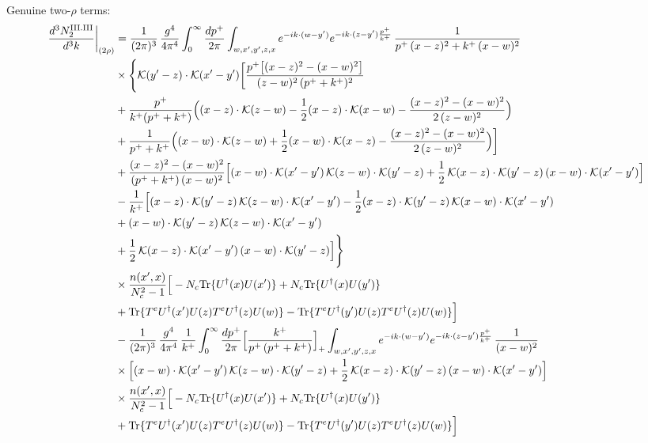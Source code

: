 \documentclass[9pt]{article}
\numberwithin{equation}{section}
\begin{document}
Genuine two-$\rho$ terms:
\begin{align}
\frac{d^{3}N^{\rm III.III}_{2}}{d^{3}k}\bigg|_{(2\rho)} & =\frac{1}{(2\pi)^{3}}\,\frac{g^{4}}{4\pi^{4}}\int_{0}^{\infty}\frac{dp^{+}}{2\pi}\int_{w,x',y',z,x}e^{-ik\cdot(w-y')}e^{-ik\cdot(z-y')\frac{p^{+}}{k^{+}}}\,\frac{1}{p^{+}\,(x-z)^{2}+k^{+}\,(x-w)^{2}}\notag\\
&\times\Bigg\{\mathcal{K}(y'-z)\cdot\mathcal{K}(x'-y')\bigg[\frac{p^{+}\big[(x-z)^{2}-(x-w)^{2}\big]}{(z-w)^{2}\,(p^{+}+k^{+})^{2}}\notag\\
&+\frac{p^{+}}{k^{+}(p^{+}+k^{+})}\Big((x-z)\cdot\mathcal{K}(z-w)-\frac{1}{2}(x-z)\cdot\mathcal{K}(x-w)-\frac{(x-z)^{2}-(x-w)^{2}}{2\,(z-w)^{2}}\Big)\notag\\
&+\frac{1}{p^{+}+k^{+}}\Big((x-w)\cdot\mathcal{K}(z-w)+\frac{1}{2}(x-w)\cdot\mathcal{K}(x-z)-\frac{(x-z)^{2}-(x-w)^{2}}{2\,(z-w)^{2}}\Big)\bigg]\notag\\
&+\frac{(x-z)^{2}-(x-w)^{2}}{(p^{+}+k^{+})\,(x-w)^{2}}\Big[(x-w)\cdot\mathcal{K}(x'-y')\,\mathcal{K}(z-w)\cdot\mathcal{K}(y'-z)+\frac{1}{2}\,\mathcal{K}(x-z)\cdot\mathcal{K}(y'-z)\,(x-w)\cdot\mathcal{K}(x'-y')\Big]\notag\\
&-\frac{1}{k^{+}}\Big[(x-z)\cdot\mathcal{K}(y'-z)\,\mathcal{K}(z-w)\cdot\mathcal{K}(x'-y')-\frac{1}{2}(x-z)\cdot\mathcal{K}(y'-z)\,\mathcal{K}(x-w)\cdot\mathcal{K}(x'-y')\notag\\
&+(x-w)\cdot\mathcal{K}(y'-z)\,\mathcal{K}(z-w)\cdot\mathcal{K}(x'-y')\notag\\
&+\frac{1}{2}\,\mathcal{K}(x-z)\cdot\mathcal{K}(x'-y')\,(x-w)\cdot\mathcal{K}(y'-z)\Big]\Bigg\}\notag\\
&\times\frac{n(x',x)}{N_{c}^{2}-1}\Big[-N_{c}{\rm Tr}\{U^{\dagger}(x)U(x')\}+N_{c}{\rm Tr}\{U^{\dagger}(x)U(y')\}\notag\\ &+{\rm Tr}\{T^{e}U^{\dagger}(x')U(z)T^{e}U^{\dagger}(z)U(w)\}-{\rm Tr}\{T^{e}U^{\dagger}(y')U(z)T^{e}U^{\dagger}(z)U(w)\}\Big]\notag\\
&-\frac{1}{(2\pi)^{3}}\,\frac{g^{4}}{4\pi^{4}}\,\frac{1}{k^{+}}\int_{0}^{\infty}\frac{dp^{+}}{2\pi}\Big[\frac{k^{+}}{p^{+}\,(p^{+}+k^{+})}\Big]_{+}\int_{w,x',y',z,x}e^{-ik\cdot(w-y')}e^{-ik\cdot(z-y')\frac{p^{+}}{k^{+}}}\,\frac{1}{(x-w)^{2}}\notag\\
&\times\Big[(x-w)\cdot\mathcal{K}(x'-y')\,\mathcal{K}(z-w)\cdot\mathcal{K}(y'-z)+\frac{1}{2}\,\mathcal{K}(x-z)\cdot\mathcal{K}(y'-z)\,(x-w)\cdot\mathcal{K}(x'-y')\Big]\notag\\
&\times\frac{n(x',x)}{N_{c}^{2}-1}\Big[-N_{c}{\rm Tr}\{U^{\dagger}(x)U(x')\}+N_{c}{\rm Tr}\{U^{\dagger}(x)U(y')\}\notag\\ &+{\rm Tr}\{T^{e}U^{\dagger}(x')U(z)T^{e}U^{\dagger}(z)U(w)\}-{\rm Tr}\{T^{e}U^{\dagger}(y')U(z)T^{e}U^{\dagger}(z)U(w)\}\Big]\notag\\

\end{align}
\end{document}
